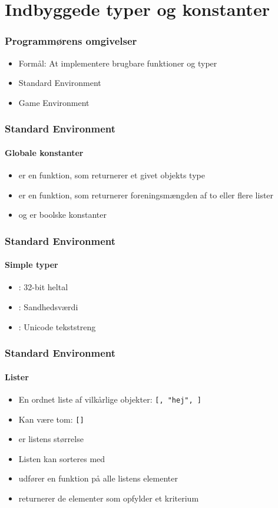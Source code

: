 \section{Indbyggede typer og konstanter}

\begin{frame}
\frametitle{Programmørens omgivelser}
\begin{itemize}
  \item Formål: At implementere brugbare funktioner og typer
\item Standard Environment
\item Game Environment
\end{itemize}
\end{frame}

\begin{frame}
\frametitle{Standard Environment}
\framesubtitle{Globale konstanter}
\begin{itemize}[<+->]
\item {} er en funktion, som returnerer et givet objekts type
\item {} er en funktion, som returnerer foreningsmængden af to eller flere lister
\item {} og  er boolske konstanter
\end{itemize}
\end{frame}

\begin{frame}
\frametitle{Standard Environment}
\framesubtitle{Simple typer}
\begin{itemize}
\item {}: 32-bit heltal
\item {}: Sandhedsværdi
\item {}: Unicode tekststreng
\end{itemize}
\end{frame}

\begin{frame}
\frametitle{Standard Environment}
\framesubtitle{Lister}
\begin{itemize}[<+->]
\item En ordnet liste af vilkårlige objekter: \texttt{[, "hej", ]}
\item Kan være tom: \texttt{[]}
\item {} er listens størrelse
\item Listen kan sorteres med 
\item {} udfører en funktion på alle listens elementer
\item {} returnerer de elementer som opfylder et kriterium
\end{itemize}
\end{frame}

